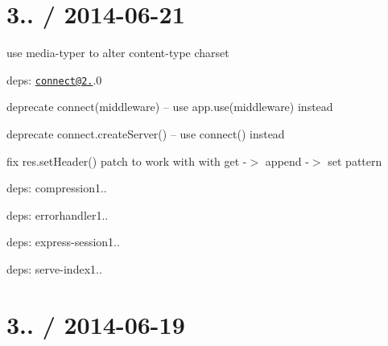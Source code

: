 \section*{3.. / 2014-\/06-\/21 }


\begin{DoxyItemize}
\item use {\ttfamily media-\/typer} to alter content-\/type charset
\item deps\+: \href{mailto:connect@2.21}{\tt connect@2.}.0
\begin{DoxyItemize}
\item deprecate {\ttfamily connect(middleware)} -- use {\ttfamily app.\+use(middleware)} instead
\item deprecate {\ttfamily connect.\+create\+Server()} -- use {\ttfamily connect()} instead
\item fix {\ttfamily res.\+set\+Header()} patch to work with with get -\/$>$ append -\/$>$ set pattern
\item deps\+: compression1..
\item deps\+: errorhandler1..
\item deps\+: express-\/session1..
\item deps\+: serve-\/index1..
\end{DoxyItemize}
\end{DoxyItemize}

\section*{3.. / 2014-\/06-\/19 }


